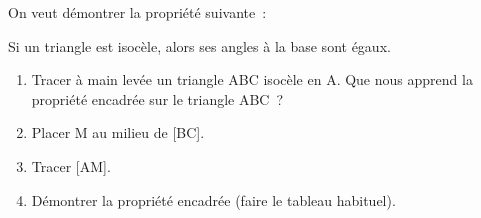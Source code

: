 \documentclass[exercice]{thedocument}%
\begin{document}
%
On veut démontrer la propriété suivante~:\medskip\par\noindent
\begin{mdframed}
    Si un triangle est isocèle, alors ses angles à la base sont égaux.
\end{mdframed}
\begin{enumerate}
    \item Tracer à main levée un triangle ABC isocèle en A. Que nous apprend
    la propriété encadrée sur le triangle ABC~?
    \item Placer M au milieu de [BC].
    \item Tracer [AM].
    \item Démontrer la propriété encadrée (faire le tableau habituel).
\end{enumerate}
\end{document}
